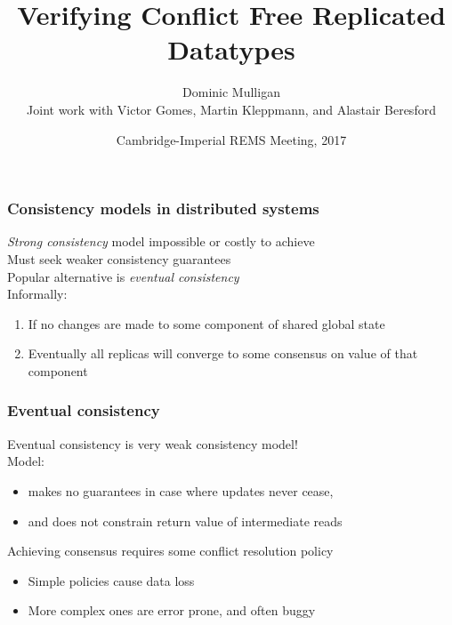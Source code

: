 \documentclass[professionalfonts,smallfonts]{beamer}
\author{Dominic Mulligan \\ Joint work with Victor Gomes, Martin Kleppmann, and Alastair Beresford}
\title{Verifying Conflict Free Replicated Datatypes}
\date{Cambridge-Imperial REMS Meeting, 2017}
\begin{document}
\begin{frame}
\maketitle
\end{frame}


\begin{frame}
\frametitle{Consistency models in distributed systems}
\emph{Strong consistency} model impossible or costly to achieve
\\[1.5ex]
Must seek weaker consistency guarantees
\\[1.5ex]
Popular alternative is \emph{eventual consistency}
\\[1.5ex]
Informally:
\begin{enumerate}
\item
If no changes are made to some component of shared global state
\item
Eventually all replicas will converge to some consensus on value of that component
\end{enumerate}
\end{frame}

\begin{frame}
\frametitle{Eventual consistency}
Eventual consistency is very weak consistency model!
\\[1.5ex]
Model:
\begin{itemize}
\item
makes no guarantees in case where updates never cease,
\item
and does not constrain return value of intermediate reads
\end{itemize}
\vspace{\baselineskip}
Achieving consensus requires some conflict resolution policy
\begin{itemize}
\item
Simple policies cause data loss
\item
More complex ones are error prone, and often buggy
\end{itemize}
\end{frame}
\end{document}

